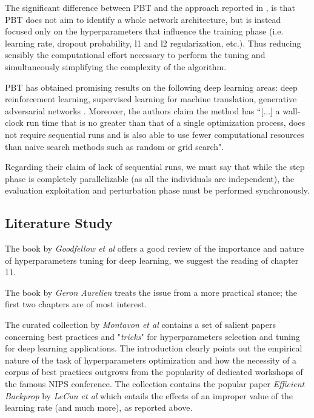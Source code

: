 \documentclass{article}
\begin{document}
    The significant difference between PBT and the approach reported in \cite{pmlr-v70-real17a}, is that PBT does not aim to identify a whole network architecture, but is instead focused only on the hyperparameters that influence the training phase (i.e. learning rate, dropout probability, l1 and l2 regularization, etc.). Thus reducing sensibly the computational effort necessary to perform the tuning and simultaneously simplifying the complexity of the algorithm.
    
    PBT has obtained promising results on the following deep learning areas: deep reinforcement learning, supervised learning for machine translation, generative adversarial networks \cite{PBT}.
    Moreover, the authors claim the method has “[...] a wall-clock run time that is no greater than that of a single optimization process, does not require sequential runs and is also able to use fewer computational resources than naive search methods such as random or grid search"\cite{PBT}. 
    
    Regarding their claim of lack of sequential runs, we must say that while the step phase is completely parallelizable (as all the individuals are independent), the evaluation exploitation and perturbation phase must be performed synchronously.


\subsection{Literature Study}
\label{sec:literatureStudy}

The book by \textit{Goodfellow et al} \cite{Goodfellow-et-al-2016} offers a good review of the importance and nature of hyperparameters tuning for deep learning, we suggest the reading of chapter 11. 

The book by \textit{Geron Aurelien}\cite{Gron:2017:HML:3153997} treats the issue from a more practical stance; the first two chapters are of most interest.

The curated collection by \textit{Montavon et al}\cite{DBLP:series/lncs/7700} contains a set of salient papers concerning best practices and "\textit{tricks}" for hyperparameters selection and tuning for deep learning applications. The introduction clearly points out the empirical nature of the task of hyperparameters optimization and how the necessity of a corpus of best practices outgrows from the popularity of dedicated workshops of the famous NIPS conference. The collection contains the popular paper \textit{Efficient Backprop} by \textit{LeCun et al}\cite{LeCun:1998:EB:645754.668382} which entails the effects of an improper value of the learning rate (and much more), as reported above.
\end{document}
